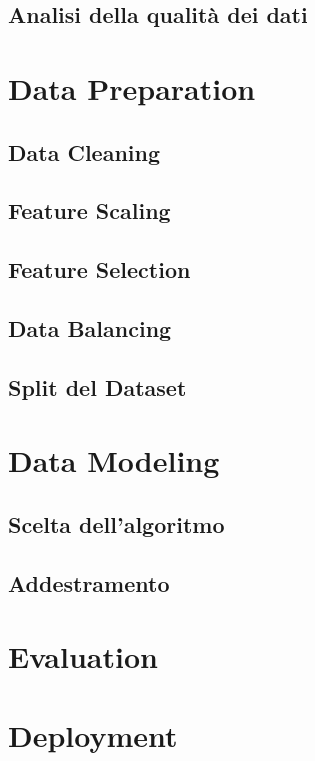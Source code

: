 \documentclass{article}
\begin{document}
    \subsection{Analisi della qualità dei dati}

\newpage
\section{Data Preparation}
    \subsection{Data Cleaning}
    \subsection{Feature Scaling}
    \subsection{Feature Selection}
    \subsection{Data Balancing}
    \subsection{Split del Dataset}

\newpage
\section{Data Modeling}
    \subsection{Scelta dell'algoritmo}
    \subsection{Addestramento}

\newpage
\section{Evaluation}

\newpage
\section{Deployment}
\end{document}
